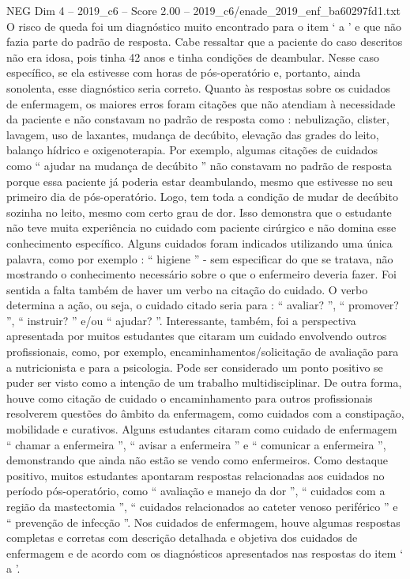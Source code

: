 \begin{textsample}{NEG Dim 4 – 2019\_c6 – Score 2.00 – 2019\_c6/enade\_2019\_enf\_ba60297fd1.txt}
O risco de queda foi um diagnóstico muito encontrado para o item ‘ a ’ e que não fazia parte do padrão de resposta.
Cabe ressaltar que a paciente do caso descritos não era idosa, pois tinha 42 anos e tinha condições de deambular.
Nesse caso específico, se ela estivesse com horas de pós-operatório e, portanto, ainda sonolenta, esse diagnóstico seria correto.
Quanto às respostas sobre os cuidados de enfermagem, os maiores erros foram citações que não atendiam à necessidade da paciente e não constavam no padrão de resposta como : nebulização, clister, lavagem, uso de laxantes, mudança de decúbito, elevação das grades do leito, balanço hídrico e oxigenoterapia.
Por exemplo, algumas citações de cuidados como “ ajudar na mudança de decúbito ” não constavam no padrão de resposta porque essa paciente já poderia estar deambulando, mesmo que estivesse no seu primeiro dia de pós-operatório.
Logo, tem toda a condição de mudar de decúbito sozinha no leito, mesmo com certo grau de dor.
Isso demonstra que o estudante não teve muita experiência no cuidado com paciente cirúrgico e não domina esse conhecimento específico.
Alguns cuidados foram indicados utilizando uma única palavra, como por exemplo : “ higiene ” - sem especificar do que se tratava, não mostrando o conhecimento necessário sobre o que o enfermeiro deveria fazer.
Foi sentida a falta também de haver um verbo na citação do cuidado.
O verbo determina a ação, ou seja, o cuidado citado seria para : “ avaliar? ”, “ promover? ”, “ instruir? ” e/ou “ ajudar? ”.
Interessante, também, foi a perspectiva apresentada por muitos estudantes que citaram um cuidado envolvendo outros profissionais, como, por exemplo, encaminhamentos/solicitação de avaliação para a nutricionista e para a psicologia.
Pode ser considerado um ponto positivo se puder ser visto como a intenção de um trabalho multidisciplinar.
De outra forma, houve como citação de cuidado o encaminhamento para outros profissionais resolverem questões do âmbito da enfermagem, como cuidados com a constipação, mobilidade e curativos.
Alguns estudantes citaram como cuidado de enfermagem “ chamar a enfermeira ”, “ avisar a enfermeira ” e “ comunicar a enfermeira ”, demonstrando que ainda não estão se vendo como enfermeiros.
Como destaque positivo, muitos estudantes apontaram respostas relacionadas aos cuidados no período pós-operatório, como “ avaliação e manejo da dor ”, “ cuidados com a região da mastectomia ”, “ cuidados relacionados ao cateter venoso periférico ” e “ prevenção de infecção ”.
Nos cuidados de enfermagem, houve algumas respostas completas e corretas com descrição detalhada e objetiva dos cuidados de enfermagem e de acordo com os diagnósticos apresentados nas respostas do item ‘ a ’.

\end{textsample}
